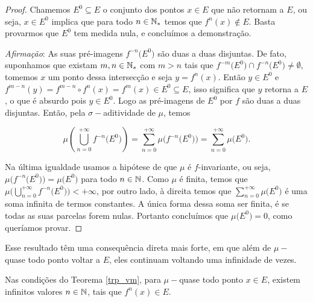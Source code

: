 \begin{proof}
Chamemos $E^0\subseteq E$ o conjunto dos pontos $x\in E$ que não retornam a $E$, ou seja, $x\in E^0$ implica que para todo $n\in\mathbb{N}_{*}$ temos que $f^n(x)\notin E$. Basta provarmos que $E^0$ tem medida nula, e concluímos a demonstração. 

\textit{Afirmação}: As suas pré-imagens $f^{-n}\big(E^0\big)$ são duas a duas disjuntas. De fato, suponhamos que existam $m,n\in\mathbb{N}_{*}$ com $m>n$ tais que $f^{-m}\big(E^0\big)\cap f^{-n}\big(E^0\big)\neq\emptyset$, tomemos $x$ um ponto dessa intersecção e seja $y=f^{n}(x)$. Então $y\in E^0$ e $f^{m-n}(y)=f^{m-n}\circ f^n(x)=f^{m}(x)\in E^0\subseteq E$, isso significa que $y$ retorna a $E$, o que é absurdo pois $y\in E^0$. Logo as pré-imagens de $E^0$ por $f$ são duas a duas disjuntas. Então, pela $\sigma-$aditividade de $\mu$, temos

\begin{equation*}
\mu\left(\bigcup_{n=0}^{+\infty}f^{-n}\big(E^0\big)\right)=\sum_{n=0}^{+\infty}\mu\Big(f^{-n}\big(E^0\big)\Big)=\sum_{n=0}^{+\infty}\mu\big(E^0\big).
\end{equation*}\vspace{0.1cm}

Na última igualdade usamos a hipótese de que $\mu$ é $f$-invariante, ou seja, $\mu\Big(f^{-n}\big(E^0\big)\Big)=\mu\big(E^0\big)$  para todo $n\in\mathbb{N}$. Como $\mu$ é finita, temos que $\mu\Big(\bigcup_{n=0}^{+\infty}f^{-n}\big(E^0\big)\Big)<+\infty$, por outro lado, à direita temos que $\sum_{n=0}^{+\infty}\mu\big(E^0\big)$ é uma soma infinita de termos constantes. A única forma dessa soma ser finita, é se todas as suas parcelas forem nulas. Portanto concluímos que $\mu\big(E^0\big)=0$, como queríamos provar. 
\end{proof}

Esse resultado têm uma consequência direta mais forte, em que além de $\mu-$ quase todo ponto voltar a $E$, eles continuam voltando uma infinidade de vezes.

\begin{corolario}
Nas condições do Teorema \ref{trp_vm}, para $\mu-$quase todo ponto $x\in E$, existem infinitos valores $n\in\mathbb{N}$, tais que $f^{n}(x)\in E$.
\end{corolario}

